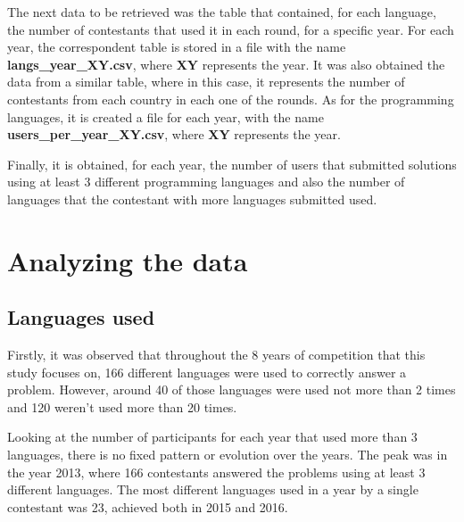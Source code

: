 \documentclass{article}
\begin{document}
\begin{multicols*}{2}
The next data to be retrieved was the table that contained, for each language, the number of contestants that used it in each round, for a specific year. For each year, the correspondent table is stored in a file with the name \textbf{langs\_year\_XY.csv}, where \textbf{XY} represents the year.
It was also obtained the data from a similar table, where in this case, it represents the number of contestants from each country in each one of the rounds. As for the programming languages, it is created a file for each year, with the name \textbf{users\_per\_year\_XY.csv}, where \textbf{XY} represents the year.


Finally, it is obtained, for each year, the number of users that submitted solutions using at least 3 different programming languages and also the number of languages that the contestant with more languages submitted used.

\section{Analyzing the data}

\subsection{Languages used}

Firstly, it was observed that throughout the 8 years of competition that this study focuses on, 166 different languages were used to correctly answer a problem. However, around 40 of those languages were used not more than 2 times and 120 weren't used more than 20 times.

Looking at the number of participants for each year that used more than 3 languages, there is no fixed pattern or evolution over the years. The peak was in the year 2013, where 166 contestants answered the problems using at least 3 different languages. The most different languages used in a year by a single contestant was 23, achieved both in 2015 and 2016.


\end{multicols*}
\end{document}
